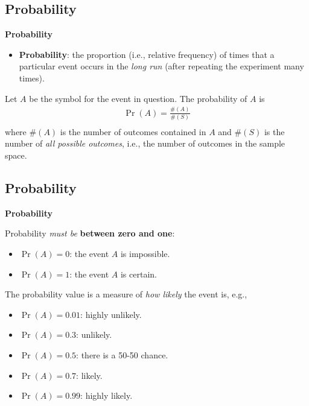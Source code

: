 \documentclass[compress]{beamer}        %
\makeatletter
\newcommand{\tcb}{\textcolor{beamer@blendedblue}}
\makeatother
\begin{document}
\subsection{Probability}
\begin{frame}{\bf \tcb{Probability}}
\begin{itemize}\itemsep0.6cm
\item {\bf Probability}: the proportion (i.e., relative frequency) of times that a particular event occurs in the \emph{long run} (after repeating the experiment many times).\\[0.5cm]
\end{itemize}
Let $A$ be the symbol for the event in question. The probability of $A$ is\\[-0.2cm]
\begin{align*}
\boxed{\Pr(A) = \frac{\#(A)}{\#(S)}}\\[-0.4cm]
\end{align*}
where $\#(A)$ is the number of outcomes contained in $A$ and $\#(S)$ is the number of \emph{all possible outcomes}, i.e., the number of outcomes in the sample space.

\end{frame}



\subsection{Probability}
\begin{frame}{\bf \tcb{Probability}}

Probability \emph{must be} {\bf between zero and one}:\\[0.3cm]
\begin{itemize}\itemsep0.6cm
\item $\Pr(A) = 0$: the event $A$ is impossible.
\item $\Pr(A) = 1$: the event $A$ is certain.\\[0.6cm]
\end{itemize}
The probability value is a measure of \emph{how likely} the event is, e.g.,\\[0.1cm]
\begin{itemize}\itemsep0.2cm
\item $\Pr(A) = 0.01$: highly unlikely.
\item $\Pr(A) = 0.3$: unlikely.
\item $\Pr(A) = 0.5$: there is a 50-50 chance.
\item $\Pr(A) = 0.7$: likely.
\item $\Pr(A) = 0.99$: highly likely.
\end{itemize}

\end{frame}
\end{document}
